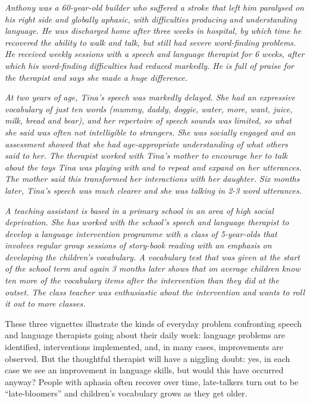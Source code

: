 \documentclass{krantz}
\begin{document}
\begin{shaded}
\textit{Anthony was a 60-year-old builder who suffered a stroke that left him paralysed on his right side and globally aphasic, with difficulties producing and understanding language. He was discharged home after three weeks in hospital, by which time he recovered the ability to walk and talk, but still had severe word-finding problems. He received weekly sessions with a speech and language therapist for 6 weeks, after which his word-finding difficulties had reduced markedly. He is full of praise for the therapist and says she made a huge difference.}
\end{shaded}
\begin{shaded}
\textit{At two years of age, Tina's speech was markedly delayed. She had an expressive vocabulary of just ten words (mummy, daddy, doggie, water, more, want, juice, milk, bread and bear), and her repertoire of speech sounds was limited, so what she said was often not intelligible to strangers. She was socially engaged and an assessment showed that she had age-appropriate understanding of what others said to her. The therapist worked with Tina's mother to encourage her to talk about the toys Tina was playing with and to repeat and expand on her utterances. The mother said this transformed her interactions with her daughter. Six months later, Tina's speech was much clearer and she was talking in 2-3 word utterances.}
\end{shaded}
\begin{shaded}
\textit{A teaching assistant is based in a primary school in an area of high social deprivation. She has worked with the school's speech and language therapist to develop a language intervention programme with a class of 5-year-olds that involves regular group sessions of story-book reading with an emphasis on developing the children's vocabulary. A vocabulary test that was given at the start of the school term and again 3 months later shows that on average children know ten more of the vocabulary items after the intervention than they did at the outset. The class teacher was enthusiastic about the intervention and wants to roll it out to more classes.}
\end{shaded}

These three vignettes illustrate the kinds of everyday problem confronting speech and language therapists going about their daily work: language problems are identified, interventions implemented, and, in many cases, improvements are observed. But the thoughtful therapist will have a niggling doubt: yes, in each case we see an improvement in language skills, but would this have occurred anyway? People with aphasia often recover over time, late-talkers turn out to be ``late-bloomers'' and children's vocabulary grows as they get older.
\end{document}
